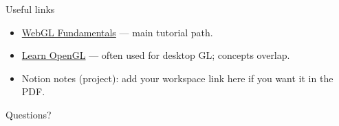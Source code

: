 \documentclass[aspectratio=169]{beamer}
\begin{document}
\begin{frame}{Useful links}
  \begin{itemize}
    \item \href{https://webglfundamentals.org/}{WebGL Fundamentals} — main tutorial path.
    \item \href{https://learnopengl.com/}{Learn OpenGL} — often used for desktop GL; concepts overlap.
    \item Notion notes (project): add your workspace link here if you want it in the PDF.
  \end{itemize}
\end{frame}

\begin{frame}{}
  \centering
  \Large Questions?
\end{frame}
\end{document}
